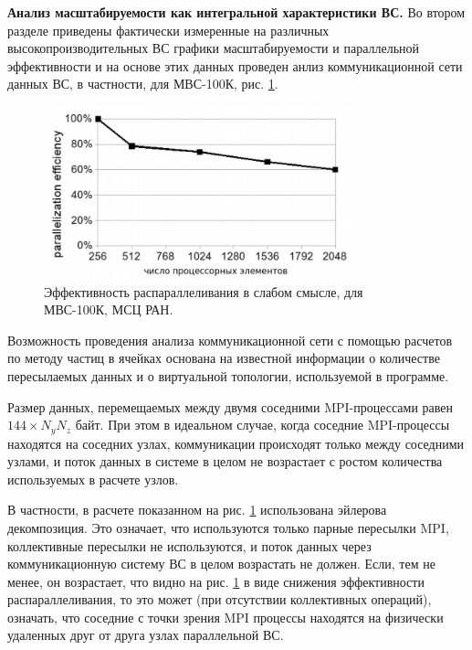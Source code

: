  


\textbf{Анализ масштабируемости как интегральной характеристики ВС.}
Во втором разделе приведены фактически измеренные на различных высокопроизводительных ВС графики масштабируемости и параллельной эффективности и на основе этих данных проведен анлиз коммуникационной сети данных ВС, в частности, для МВС-100К, рис. \ref{eff2}. 

\begin{figure}[h]
	\begin{center}
		\includegraphics[height=5cm,keepaspectratio]{images/eff_weak_JSCC.png}
		\caption{
			Эффективность распараллеливания в слабом смысле, для МВС-100К, МСЦ РАН.
		}
		\label{eff2}
	\end{center} 
\end{figure}

Возможность проведения анализа коммуникационной сети с помощью расчетов по методу частиц в ячейках основана на известной информации о количестве пересылаемых данных и о виртуальной топологии, используемой в программе.

Размер данных, перемещаемых между двумя соседними MPI-процессами равен $144 \times N_y N_z  $ байт. При этом в идеальном случае, когда соседние MPI-процессы находятся на соседних узлах, коммуникации происходят только между соседними узлами, и поток данных в системе в целом не возрастает с ростом количества используемых в расчете узлов.

В частности, в расчете показанном на рис. \ref{eff2} использована эйлерова декомпозиция. Это означает, что используются только парные пересылки MPI, коллективные пересылки не используются, и поток данных через коммуникационную систему ВС в целом возрастать не должен. Если, тем не менее, он возрастает, что видно на рис. \ref{eff2} в виде снижения эффективности распараллеливания, то это может (при отсутствии коллективных операций), означать, что соседние с точки зрения MPI процессы находятся на физически удаленных друг от друга узлах параллельной ВС.

